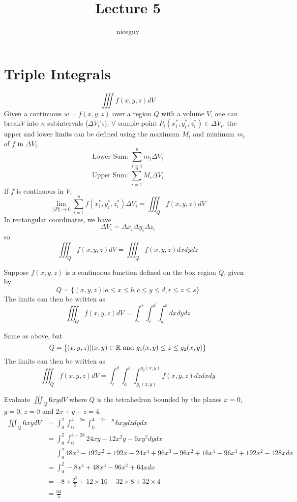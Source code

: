 \documentclass[12pt]{article}
\author{niceguy}
\title{Lecture 5}
\begin{document}
\maketitle

\section{Triple Integrals}
$$\iiint f(x,y,z)dV$$
Given a continuous $w = f(x,y,z)$ over a region $Q$ with a volume $V$, one can break$V$ into $n$ subintervals ($\Delta V_i$'s). $\forall$ sample point $P_i(x_i^*, y_i^*, z_i^*) \in \Delta V_i$, the upper and lower limits can be defined using the maximum $M_i$ and minimum $m_i$ of $f$ in $\Delta V_i$.
$$\text{Lower Sum: } \sum_{i=1}^n m_i \Delta V_i$$
$$\text{Upper Sum: } \sum_{i=1}^n M_i \Delta V_i$$
If $f$ is continuous in $V$,
$$\lim_{||P|| \rightarrow 0} \sum_{i=1}^n f(x_i^*, y_i^*, z_i^*) \Delta V_i = \iiint_Q f(x,y,z) dV$$
In rectangular coordinates, we have
$$\Delta V_i = \Delta x_i \Delta y_i \Delta z_i$$
so
$$\iiint_Q f(x,y,z) dV = \iiint_Q f(x,y,z)dxdydz$$

\begin{ex}
	Suppose $f(x,y,z)$ is a continuous function defined on the box region $Q$, given by
	$$Q = \{(x,y,z) | a \leq x \leq b, c \leq y \leq d, r \leq z \leq s\}$$
	The limits can then be written as
	$$\iiint_Q f(x,y,z) dV = \int_r^s \int_c^d \int_a^b dxdydz$$
\end{ex}

\begin{ex}
	Same as above, but
	$$Q = \{(x,y,z)|(x,y) \in \mathbb{R} \text{ and } g_1(x,y) \leq z \leq g_2(x,y)\}$$
	The limits can then be written as
	$$\iiint_Q f(x,y,z) dV = \int_c^d \int_a^b \int_{g_1(x,y)}^{g_2(x,y)} f(x,y,z)dzdxdy$$
\end{ex}

\begin{ex}
	Evaluate $\iiint_Q 6xydV$ where $Q$ is the tetrahedron bounded by the planes $x=0$, $y=0$, $z=0$ and $2x+y+z=4$.
	\begin{align*}
		\iiint_Q 6xydV &= \int_0^2 \int_0^{4-2x} \int_0^{4-2x-y} 6xy dzdydx \\
			       &= \int_0^2 \int_0^{4-2x} 24xy - 12x^2y - 6xy^2 dydx \\
			       &= \int_0^2 48x^3 - 192x^2 + 192x - 24x^4 + 96x^3 - 96x^2 + 16x^4 - 96x^3 + 192x^2 - 128x dx \\
			       &= \int_0^2 -8x^4 + 48x^3 - 96x^2 + 64x dx \\
			       &= -8 \times \frac{2^5}{5} + 12 \times 16 - 32 \times 8 + 32 \times 4 \\
			       &= \frac{64}{5} \\
	\end{align*}
\end{ex}
\end{document}
